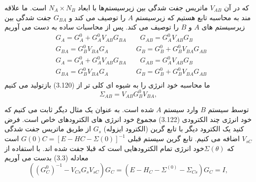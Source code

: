 که در آن $V_{AB}$ ماتریس جفت شدگی بین زیرسیستم‌ها با ابعاد $N_A\times N_B$ است. ما علاقه مند به محاسبه تابع  هستیم که زیرسیستم $A$ را توصیف می کند و $G_{BA}$ جفت شدگی بین زیرسیستم های $A$ و $B$ را توصیف می کند. پس از محاسبات ساده به دست می آوریم
\begin{equation}
    \begin{split}
          & {{G}_{A}}=G_{A}^{0}+G_{A}^{0}{{V}_{AB}}{{G}_{BA}}\qquad {{G}_{AB}}=G_{A}^{0}{{V}_{AB}}{{G}_{B}} \\ 
         & {{G}_{BA}}=G_{B}^{0}{{V}_{BA}}{{G}_{A}}\qquad \qquad {{G}_{B}}=G_{B}^{0}+G_{B}^{0}{{V}_{BA}}{{G}_{AB}} \\ 
         & {{G}_{A}}=G_{A}^{0}+G_{A}^{0}{{V}_{AB}}{{G}_{BA}}\qquad {{G}_{AB}}=G_{A}^{0}{{V}_{AB}}{{G}_{B}} \\ 
        & {{G}_{BA}}=G_{B}^{0}{{V}_{BA}}{{G}_{A}}\qquad \qquad {{G}_{B}}=G_{B}^{0}+G_{B}^{0}{{V}_{BA}}{{G}_{AB}} \\ 
    \end{split}
\end{equation}
ما محاسبه خود انرژی را به شیوه ای کلی تر از (3.120) بازتولید می کنیم 
\begin{equation}
    {{\Sigma }_{AB}}={{V}_{AB}}G_{B}^{0}{{V}_{BA}},
\end{equation}

توسط سیستم $B$ وارد سیستم $A$ شده است.
به عنوان یک مثال دیگر ثابت می کنیم که خود انرژی چند الکترودی (3.122) مجموع خود انرژی های الکترودهای خاص است. فرض کنید یک الکترود دیگر با تابع گرین (الکترود ایزوله) $G_s$ از طریق ماتریس جفت شدگی $V_{sC}$ اضافه می کنیم. تابع گرین سیستم قبلی $G(0)C= [E−HC−Σ(0)]^{-1}$ است که $\Sigma(\theta)$خود انرژی تمام الکترودهایی است که قبلا جفت شده اند. با استفاده از معادله (3.3) بدست می آوریم
\begin{equation}
    \left( {{\left( G_{C}^{0} \right)}^{-1}}-{{V}_{Cs}}{{G}_{s}}{{V}_{sC}} \right){{G}_{C}}=\left( E-{{H}_{C}}-{{\Sigma }^{(0)}}-{{\Sigma }_{Cs}} \right){{G}_{C}}=I,
\end{equation}

